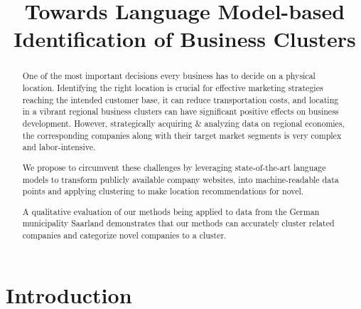 \documentclass[conference]{IEEEtran}
\begin{document}
\title{Towards Language Model-based Identification of Business Clusters}

\author{
\and
{}
\and
{}
\and
{}
\and
{}
}

\maketitle

\begin{abstract}
	One of the most important decisions every business has to decide on a physical location. Identifying the right location is crucial for effective marketing strategies reaching the intended customer base, it can reduce transportation costs, and locating in a vibrant regional business clusters can have significant positive effects on business development.
	However, strategically acquiring \& analyzing data on regional economies, the corresponding companies along with their target market segments is very complex and labor-intensive. 

	We propose to circumvent these challenges by leveraging state-of-the-art language models to transform publicly available company websites, into machine-readable data points and  applying clustering to make location recommendations for novel.
	
	A qualitative evaluation of our methods being applied to data from the German municipality Saarland demonstrates that our methods can accurately cluster related companies and categorize novel companies to a cluster.
\end{abstract}


\section{Introduction}
\end{document}
